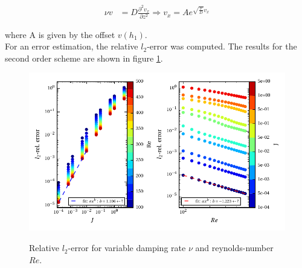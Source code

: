 \begin{align}
 \nu v &= D \frac{\partial^2 v_x}{\partial z^2}  \Rightarrow  v_x = A e^{\sqrt{\frac{\nu}{D}}v_x}
\end{align}

where A is given by the offset $v(h_1)$.\\
For an error estimation, the relative $l_2$-error was computed.
The results for the second order scheme are shown in figure \ref{fig:vp_error}.

\begin{figure}[!t]
  \centering
  \includegraphics{gfx/immersed_boundary/poiseuille_flow/2_vp/vp_error.pdf}\label{fig:vp_error}
  \caption{Relative $l_2$-error for variable damping rate $\nu$ and reynolds-number $Re$.}
\end{figure}


